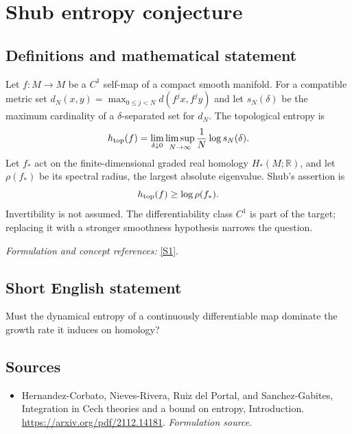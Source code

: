 \documentclass[11pt]{article}
\begin{document}
\section*{\texorpdfstring{Shub entropy conjecture}{Shub entropy conjecture}}\label{445}
\subsection{Definitions and mathematical statement}
Let $f:M\to M$ be a $C^1$ self-map of a compact smooth manifold. For a compatible metric set $d_N(x,y)=\max_{0\le j<N}d(f^jx,f^jy)$ and let $s_N(\delta)$ be the maximum cardinality of a $\delta$-separated set for $d_N$. The topological entropy is
\[
 h_{\rm top}(f)=\lim_{\delta\downarrow0}\limsup_{N\to\infty}
 \frac1N\log s_N(\delta).
\]
Let $f_*$ act on the finite-dimensional graded real homology $H_*(M;{\mathbb{R}})$, and let $\rho(f_*)$ be its spectral radius, the largest absolute eigenvalue. Shub's assertion is
\[
 h_{\rm top}(f)\ge\log\rho(f_*).
\]
Invertibility is not assumed. The differentiability class $C^1$ is part of the target; replacing it with a stronger smoothness hypothesis narrows the question.
\par\smallskip\textit{Formulation and concept references:} \href{https://arxiv.org/pdf/2112.14181}{[S1]}.

\subsection{Short English statement}
Must the dynamical entropy of a continuously differentiable map dominate the growth rate it induces on homology?
\subsection{Sources}
\begin{itemize}
\item[S1]Hernandez-Corbato, Nieves-Rivera, Ruiz del Portal, and Sanchez-Gabites, Integration in Cech theories and a bound on entropy, Introduction.
\url{https://arxiv.org/pdf/2112.14181}.
\textit{Formulation source.}
\end{itemize}
\end{document}
